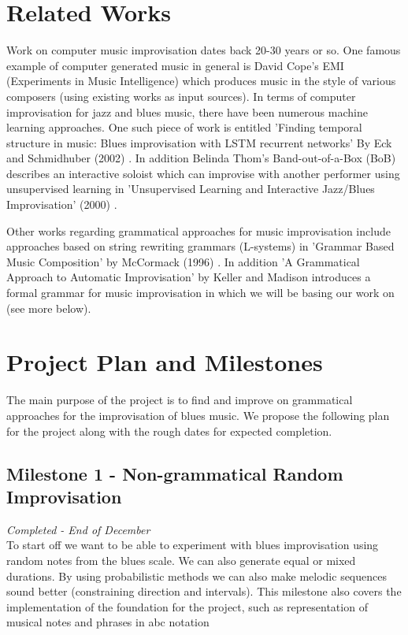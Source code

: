 \documentclass[pdftex,12pt,a4paper]{report}
\begin{document}
\section{Related Works}
Work on computer music improvisation dates back 20-30 years or so. One famous example of computer generated music in general is David Cope's EMI (Experiments in Music Intelligence) which produces music in the style of various composers (using existing works as input sources). In terms of computer improvisation for jazz and blues music, there have been numerous machine learning approaches. One such piece of work is entitled 'Finding temporal structure in music: Blues improvisation with LSTM recurrent networks' By Eck and Schmidhuber (2002) \cite{eck02}. In addition Belinda Thom's Band-out-of-a-Box (BoB) describes an interactive soloist which can improvise with another performer using unsupervised learning in 'Unsupervised Learning and Interactive Jazz/Blues Improvisation' (2000) \cite{thom2000}.

Other works regarding grammatical approaches for music improvisation include approaches based on string rewriting grammars (L-systems) in 'Grammar Based Music Composition' by McCormack (1996) \cite{mccormack96}. In addition 'A Grammatical Approach to Automatic Improvisation' by Keller and Madison \cite{keller07} introduces a formal grammar for music improvisation in which we will be basing our work on (see more below).


\section{Project Plan and Milestones}

The main purpose of the project is to find and improve on grammatical approaches for the improvisation of blues music. We propose the following plan for the project along with the rough dates for expected completion. 

\subsection{Milestone 1 - Non-grammatical Random Improvisation}
\emph{Completed - End of December} \\
To start off we want to be able to experiment with blues improvisation using random notes from the blues scale. We can also generate equal or mixed durations. By using probabilistic methods we can also make melodic sequences sound better (constraining direction and intervals). This milestone also covers the implementation of the foundation for the project, such as representation of musical notes and phrases in abc notation
\end{document}

